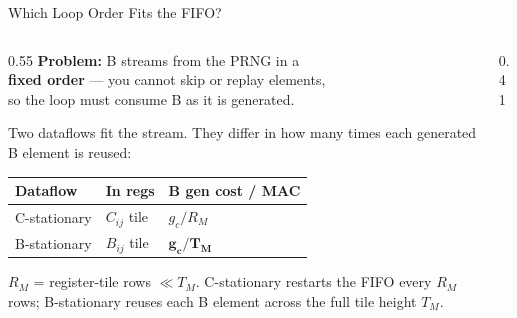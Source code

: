 \documentclass[aspectratio=169]{beamer}
\begin{document}
\begin{frame}{Which Loop Order Fits the FIFO?}

  \begin{columns}[c]

    \begin{column}{0.55\textwidth}
        \textbf{Problem:} B streams from the PRNG in a\\
        \textbf{fixed order} --- you cannot skip or replay elements,\\
        so the loop must consume B as it is generated.

      \medskip
      Two dataflows fit the stream. They differ in how many
      times each generated B element is reused:

      \bigskip
      \renewcommand{\arraystretch}{1.55}
      \begin{tabular}{@{}p{2.5cm}p{1.5cm}l@{}}
        \toprule
        Dataflow & In regs & B gen cost / MAC \\
        \midrule
        C-stationary  & $C_{ij}$ tile & $g_c / R_M$ \\[2pt]
        B-stationary  & $B_{ij}$ tile & $\boldsymbol{g_c / T_M}$ \\
        \bottomrule
      \end{tabular}

      \smallskip
      {\footnotesize $R_M$ = register-tile rows $\ll T_M$. C-stationary
      restarts the FIFO every $R_M$ rows; B-stationary reuses each
      B element across the full tile height $T_M$.}
    \end{column}

    \begin{column}{0.41\textwidth}
    \centering
\end{column}
\end{columns}
\end{frame}
\end{document}
